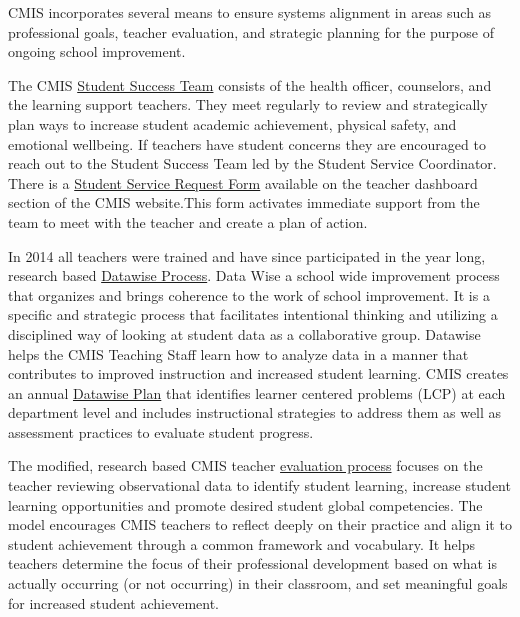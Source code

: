 
\begin{findings}
CMIS incorporates several means to ensure systems alignment in areas such as professional goals, teacher evaluation, and strategic planning for the purpose of ongoing school improvement.

The CMIS \href{https://docs.google.com/a/cmis.ac.th/presentation/d/1sWhr1U3qZIGEu2aQdWOl0OQ5Rkd8iRGWmUlszEJLz2o/edit?usp=sharing}{Student Success Team} consists of the health officer, counselors, and the learning support teachers. They meet regularly to review and strategically plan ways to increase student academic achievement, physical safety, and emotional wellbeing. If teachers have student concerns they are encouraged to reach out to the Student Success Team led by the Student Service Coordinator. There is a \href{https://docs.google.com/a/cmis.ac.th/forms/d/e/1FAIpQLScVtFtaEXarGOjwsiJyGdbLAMbeNzG9m44i1fWXFLbtMKZcUg/viewform}{Student Service Request Form} available on the teacher dashboard section of the CMIS website.This form activates immediate support from the team to meet with the teacher and create a plan of action.

In 2014 all teachers were trained and have since participated in the year long, research based \href{https://drive.google.com/a/cmis.ac.th/file/d/0B71_pYxcTLo-OExlV0Y5UVFBNVU/view?usp=sharing}{Datawise Process}. Data Wise a school wide improvement process that organizes and brings coherence to the work of school improvement.  It is a specific and strategic process that facilitates intentional thinking and utilizing a disciplined way of looking at student data as a collaborative group. Datawise helps the CMIS Teaching Staff learn how to analyze data in a manner that contributes to improved instruction and increased student learning. CMIS creates an annual \href{https://docs.google.com/document/d/1TmnCp5qZiZAUMnUmaU32PBn2UGvCMVtFO8r5OsxwNo4/edit}{Datawise Plan} that identifies learner centered problems (LCP) at each department level and includes instructional strategies to address them as well as assessment practices to evaluate student progress.

The modified, research based CMIS teacher \href{https://docs.google.com/document/d/15_5X5QtixmWVheEUBVO9N1aislsLDm_ZW4-4g4YQ7F4/edit?usp=sharing}{evaluation process} focuses on the teacher reviewing observational data to identify student learning, increase student learning opportunities and promote desired student global competencies. The model encourages CMIS teachers to reflect deeply on their practice and align it to student achievement through a common framework and vocabulary. It helps teachers determine the focus of their professional development based on what is actually occurring (or not occurring) in their classroom, and set meaningful goals for increased student achievement. 


\end{findings}
